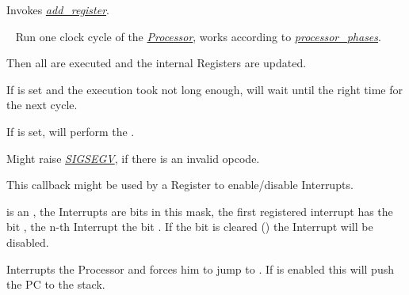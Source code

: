 \documentclass[letterpaper,10pt,english]{sphinxmanual}
\begin{document}
\begin{fulllineitems}
\begin{fulllineitems}
Invokes {\hyperref[core:add\string-register]{\emph{add\_register}}}.

\end{fulllineitems}


\begin{fulllineitems}
\label{core:py_register_machine2.core.processor.Processor.do_cycle}~\label{core:do-cycle}
Run one clock cycle of the {\hyperref[core:id2]{\emph{Processor}}},
works according to {\hyperref[core:processor\string-phases]{\emph{processor\_phases}}}.

Then all  are executed and the internal Registers are updated.

If  is set and the execution took not long enough,
 will wait until the right time for the next cycle.

If  is set,  will perform the .

Might raise {\hyperref[core:sigsegv]{\emph{SIGSEGV}}}, if there is an invalid opcode.

\end{fulllineitems}


\begin{fulllineitems}
\label{core:py_register_machine2.core.processor.Processor.en_dis_able_interrupts}
This callback might be used by a Register to enable/disable Interrupts.

 is an , the Interrupts are bits in this mask, the first registered interrupt
has the bit , the n-th Interrupt the bit .
If the bit is cleared () the Interrupt will be disabled.

\end{fulllineitems}


\begin{fulllineitems}
\label{core:py_register_machine2.core.processor.Processor.interrupt}
Interrupts the Processor and forces him to jump to .
If  is enabled this will push the PC to the stack.


\end{fulllineitems}
\end{fulllineitems}
\end{document}
